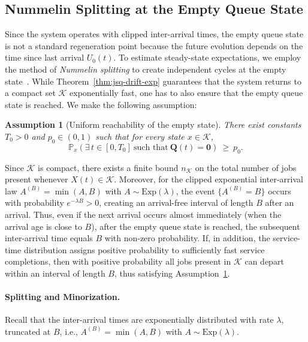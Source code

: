 \documentclass[11pt]{article}
\newtheorem{assumption}{Assumption}
\begin{document}
\subsection{Nummelin Splitting at the Empty Queue State}
\label{subsec:splitting}

Since the system operates with clipped inter-arrival times, the empty queue state is not a standard regeneration point because the future evolution depends on the time since last arrival $U_0(t)$. To estimate steady-state expectations, we employ the method of \textit{Nummelin splitting} to create independent cycles at the empty state~\cite{nummelin1978splitting,meyn1993stability,henderson2001regenerative}.
While Theorem~\ref{thm:jsq-drift-exp} guarantees that the system returns to a compact set $\mathcal{K}$ exponentially fast, one has to also ensure that the empty queue state is reached. We make the following assumption:
\begin{assumption}[Uniform reachability of the empty state]
\label{ass:reach0}
There exist constants $T_0>0$ and $p_0\in(0,1)$ such that for every state $x\in \mathcal{K}$,
\[
\mathbb{P}_x\!\left(\exists\, t\in[0,T_0]\ \text{such that}\ \mathbf{Q}(t)=\mathbf{0}\right)
\ \ge\ p_0 .
\]
\end{assumption}
Since $\mathcal{K}$ is compact, there exists a finite bound $n_\mathcal{K}$ on the total number of jobs
present whenever $X(t)\in \mathcal{K}$. Moreover, for the clipped exponential inter-arrival law
$A^{(B)}=\min(A,B)$ with $A\sim\mathrm{Exp}(\lambda)$, the event $\{A^{(B)}=B\}$ occurs with
probability $e^{-\lambda B}>0$, creating an arrival-free interval of length $B$ after an arrival.
Thus, even if the next arrival occurs almost immediately (when the arrival age is close to $B$),
after the empty queue state is reached, the subsequent inter-arrival time equals $B$ with non-zero probability.
If, in addition, the service-time distribution assigns positive probability to sufficiently fast
service completions, then with positive probability all jobs present in $\mathcal{K}$ can depart within an
interval of length $B$, thus satisfying Assumption~\ref{ass:reach0}.

\paragraph{Splitting and Minorization.}
Recall that the inter-arrival times are exponentially distributed with rate
$\lambda$, truncated at $B$, i.e.,
$A^{(B)}=\min(A,B)$ with $A\sim\mathrm{Exp}(\lambda)$.
\end{document}
